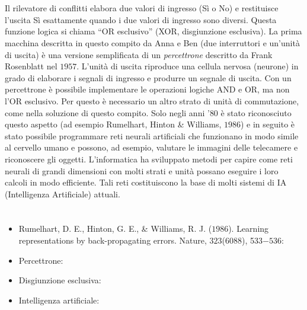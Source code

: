 {{\section*{\BrochureItsInformatics}
Il rilevatore di conflitti elabora due valori di ingresso (Sì o No) e restituisce l’uscita Sì esattamente quando i due valori di ingresso sono diversi. Questa funzione logica si chiama \enquote{OR esclusivo} (XOR, disgiunzione esclusiva). La prima macchina descritta in questo compito da Anna e Ben (due interruttori e un’unità di uscita) è una versione semplificata di un \emph{percettrone} descritto da Frank Rosenblatt nel $1957$. L’unità di uscita riproduce una cellula nervosa (neurone) in grado di elaborare i segnali di ingresso e produrre un segnale di uscita. Con un percettrone è possibile implementare le operazioni logiche AND e OR, ma non l’OR esclusivo. Per questo è necessario un altro strato di unità di commutazione, come nella soluzione di questo compito. Solo negli anni '$80$ è stato riconosciuto questo aspetto (ad esempio Rumelhart, Hinton \& Williams, $1986$) e in seguito è stato possibile programmare reti neurali artificiali che funzionano in modo simile al cervello umano e possono, ad esempio, valutare le immagini delle telecamere e riconoscere gli oggetti.  L’informatica ha sviluppato metodi per capire come reti neurali di grandi dimensioni con molti strati e unità possano eseguire i loro calcoli in modo efficiente.  Tali reti costituiscono la base di molti sistemi di IA (Intelligenza Artificiale) attuali.



\section*{\BrochureWebsitesAndKeywords}
{\raggedright
\begin{itemize}
  \item Rumelhart, D. E., Hinton, G. E., \& Williams, R. J. ($1986$). Learning representations by back-propagating errors. Nature, $323$($6088$), 533$-536$: \href{http://www.cs.toronto.edu/~hinton/absps/naturebp.pdf}{}
  \item Percettrone: \href{https://it.wikipedia.org/wiki/Percettrone}{}
  \item Disgiunzione esclusiva: \href{https://it.wikipedia.org/wiki/Disgiunzione_esclusiva}{}
  \item Intelligenza artificiale: \href{https://it.wikipedia.org/wiki/Intelligenza_artificiale}{}
\end{itemize}


}}}
